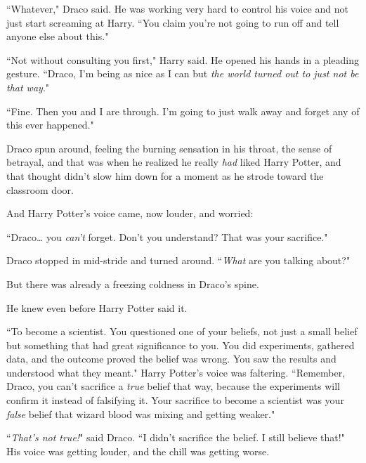 ``Whatever," Draco said. He was working very hard to control his voice and not just start screaming at Harry. ``You claim you're not going to run off and tell anyone else about this."

``Not without consulting you first," Harry said. He opened his hands in a pleading gesture. ``Draco, I'm being as nice as I can but \emph{the world turned out to just not be that way}."

``Fine. Then you and I are through. I'm going to just walk away and forget any of this ever happened."

Draco spun around, feeling the burning sensation in his throat, the sense of betrayal, and that was when he realized he really \emph{had} liked Harry Potter, and that thought didn't slow him down for a moment as he strode toward the classroom door.

And Harry Potter's voice came, now louder, and worried:

``Draco{\ldots} you \emph{can't} forget. Don't you understand? That was your sacrifice."

Draco stopped in mid-stride and turned around. ``\emph{What} are you talking about?"

But there was already a freezing coldness in Draco's spine.

He knew even before Harry Potter said it.

``To become a scientist. You questioned one of your beliefs, not just a small belief but something that had great significance to you. You did experiments, gathered data, and the outcome proved the belief was wrong. You saw the results and understood what they meant." Harry Potter's voice was faltering. ``Remember, Draco, you can't sacrifice a \emph{true} belief that way, because the experiments will confirm it instead of falsifying it. Your sacrifice to become a scientist was your \emph{false} belief that wizard blood was mixing and getting weaker."

``\emph{That's not true!}" said Draco. ``I didn't sacrifice the belief. I still believe that!" His voice was getting louder, and the chill was getting worse.

